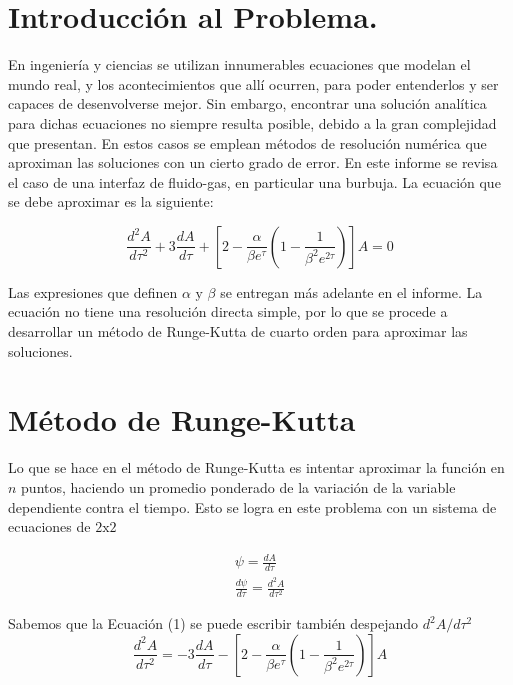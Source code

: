 \documentclass[12pt, notitlepage]{article}
\begin{document}
\section{Introducción al Problema.}
En ingeniería y ciencias se utilizan innumerables ecuaciones que modelan el mundo real, y los acontecimientos que allí ocurren, para poder entenderlos y ser capaces de desenvolverse mejor. Sin embargo, encontrar una solución analítica para dichas ecuaciones no siempre resulta posible, debido a la gran complejidad que presentan. En estos casos se emplean métodos de resolución numérica que aproximan las soluciones con un cierto grado de error. En este informe se revisa el caso de una interfaz de fluido-gas, en particular una burbuja. La ecuación que se debe aproximar es la siguiente:

\begin{equation}
\frac{d^2A}{d\tau^2} + 3\frac{dA}{d\tau} + \left[2 - \frac{\alpha}{\beta e^\tau}\left(1 - \frac{1}{\beta^2e^{2\tau}}\right)\right]A = 0
\end{equation}

Las expresiones que definen $\alpha \text{ y } \beta$ se entregan más adelante en el informe.
La ecuación no tiene una resolución directa simple, por lo que se procede a desarrollar un método de Runge-Kutta de cuarto orden para aproximar las soluciones.

\section{Método de Runge-Kutta}
Lo que se hace en el método de Runge-Kutta es intentar aproximar la función en $n$ puntos, haciendo un promedio ponderado de la variación de la variable dependiente contra el tiempo. Esto se logra en este problema con un sistema de ecuaciones de $2\text{x}2$

\begin{gather}
\psi = \frac{dA}{d\tau}\\
\frac{d\psi}{d\tau} = \frac{d^2A}{d\tau^2}
\end{gather}

Sabemos que la Ecuación (1) se puede escribir también despejando $d^2A/d\tau^2$
\begin{equation*}
\frac{d^2A}{d\tau^2} = - 3\frac{dA}{d\tau} - \left[2 - \frac{\alpha}{\beta e^\tau}\left(1 - \frac{1}{\beta^2e^{2\tau}}\right)\right]A
\end{equation*}
\end{document}
